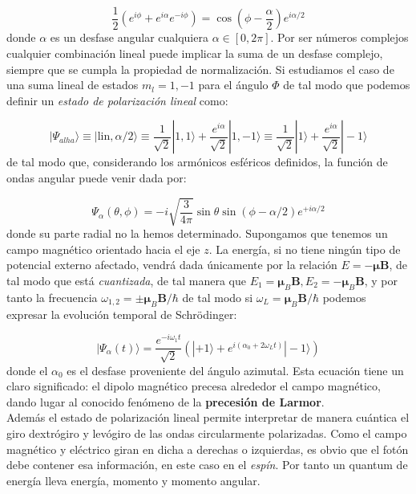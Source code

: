 \documentclass[12pt,a4paper]{article}
\numberwithin{equation}{section}
\numberwithin{figure}{section}
\newcommand{\parentesis}[1]{\left( #1  \right)}
\newcommand{\nmu}{\boldsymbol{\mu}}
\newcommand{\Bn}{\mathbf{B}}
\begin{document}
\begin{equation}
\dfrac{1}{2} \parentesis{e^{i \phi }  + e^{i \alpha} e^{- i \phi}} = \cos \parentesis{\phi - \frac{\alpha}{2}} e^{i \alpha/2}
\end{equation}
donde $\alpha$ es un desfase angular cualquiera $\alpha \in [0,2 \pi]$. Por ser números complejos cualquier combinación lineal puede implicar la suma de un desfase complejo, siempre que se cumpla la propiedad de normalización. Si estudiamos el caso de una suma lineal de estados $m_l=1,-1$ para el ángulo $\Phi$ de tal modo que podemos definir un \textit{estado de polarización lineal} como:

\begin{equation}
| \Psi_{alha} \rangle \equiv | \mathrm{lin}, \alpha/2 \rangle \equiv \dfrac{1}{\sqrt{2}} |1,1\rangle + \dfrac{e^{i \alpha}}{\sqrt{2}} |1,- 1 \rangle\equiv \dfrac{1}{\sqrt{2}} |1\rangle + \dfrac{e^{i \alpha}}{\sqrt{2}} | - 1 \rangle
\end{equation} 
de tal modo que, considerando los armónicos esféricos definidos, la función de ondas angular puede venir dada por:

\begin{equation}
\Psi_{\alpha} (\theta,\phi) = - i \sqrt{\frac{3}{4 \pi}} \sin \theta \sin (\phi - \alpha/2) e^{+ i \alpha/2}
\end{equation}
donde su parte radial no la hemos determinado. Supongamos que tenemos un campo magnético orientado hacia el eje $z$. La energía, si no tiene ningún tipo de potencial externo afectado, vendrá dada únicamente por la relación $E = - \nmu \Bn$, de tal modo que está \textit{cuantizada}, de tal manera que $E_1 = \nmu_B \Bn, E_2 = - \nmu_B \Bn$, y por tanto la frecuencia $\omega_{1,2} = \pm \nmu_B \Bn / \hbar$ de tal modo si $\omega_L = \nmu_B \Bn / \hbar$ podemos expresar la evolución temporal de Schrödinger:

\begin{equation}
| \Psi_{\alpha} (t) \rangle = \dfrac{e^{-i \omega_1 t}}{\sqrt{2}} \parentesis{ | + 1 \rangle + e^{i (\alpha_0 + 2 \omega_L t)} | - 1\rangle}
\end{equation}
donde el $\alpha_0$ es el desfase proveniente del ángulo azimutal. Esta ecuación tiene un claro significado: el dipolo magnético precesa alrededor el campo magnético, dando lugar al conocido fenómeno  de la \textbf{precesión de Larmor}. \\

Además el estado de polarización lineal permite interpretar de manera cuántica el giro dextrógiro y levógiro de las ondas circularmente polarizadas. Como el campo magnético y eléctrico giran en dicha a derechas o izquierdas, es obvio que el fotón debe contener esa información, en este caso en el \textit{espín}. Por tanto un quantum de energía lleva energía, momento y momento angular. \\
\end{document}
